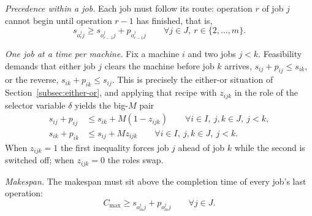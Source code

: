 \emph{Precedence within a job.}
Each job must follow its route: operation $r$ of job $j$ cannot begin until operation $r-1$ has finished, that is,
$$
s_{o^{j}_{r} j} \geq s_{o^{j}_{r-1} j} + p_{o^{j}_{r-1} j} \qquad \forall j \in J, \ r \in \{2, \dots, m\}.
$$

\emph{One job at a time per machine.}
Fix a machine $i$ and two jobs $j < k$.
Feasibility demands that either job $j$ clears the machine before job $k$ arrives, $s_{ij} + p_{ij} \leq s_{ik}$, or the reverse, $s_{ik} + p_{ik} \leq s_{ij}$.
This is precisely the either-or situation of Section~\ref{subsec:either-or}, and applying that recipe with $z_{ijk}$ in the role of the selector variable $\delta$ yields the big-$M$ pair
$$
\begin{aligned}
s_{ij} + p_{ij} &\leq s_{ik} + M(1 - z_{ijk}) \qquad \forall i \in I, \ j,k \in J, \ j < k,\\
s_{ik} + p_{ik} &\leq s_{ij} + M z_{ijk} \qquad \forall i \in I, \ j,k \in J, \ j < k.
\end{aligned}
$$
When $z_{ijk} = 1$ the first inequality forces job $j$ ahead of job $k$ while the second is switched off; when $z_{ijk} = 0$ the roles swap.

\emph{Makespan.}
The makespan must sit above the completion time of every job's last operation:
$$
C_{\max} \geq s_{o^{j}_{m} j} + p_{o^{j}_{m} j} \qquad \forall j \in J.
$$

